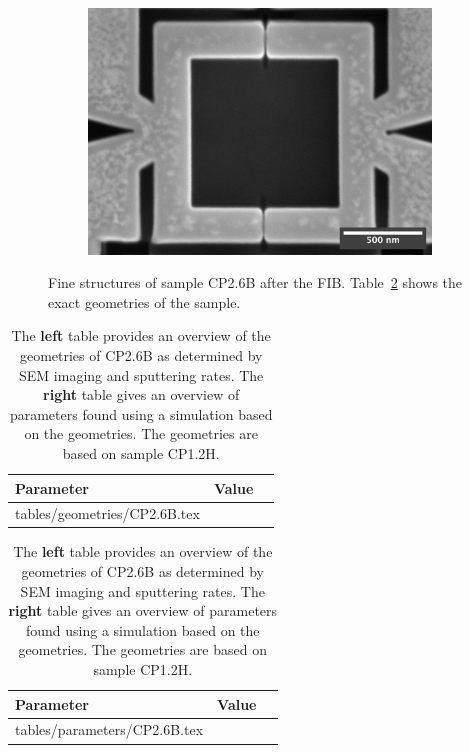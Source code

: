 \begin{figure}[ht!]
\begin{subfigure}[t]{0.3\textwidth}
	\end{subfigure}
	\hfill
	\begin{subfigure}[t]{0.3\textwidth}
		\centering
		\includegraphics[width=\textwidth]{figures/samples/CP2/CP2.6B_SEM_SQUID.jpg}
	\end{subfigure}

	\caption{Fine structures of sample CP2.6B after the FIB. Table~\ref{tab:CP2.6B-geometries} shows the exact geometries of the sample.}
	\label{fig:CP2.6B-SEM-images}
\end{figure}

\begin{table}
	\begin{subtable}{.6\linewidth}
		\begin{tabular}[t]{@{}lrr@{}}
			\toprule
			Parameter & Value \\ \midrule
			\expandableinput tables/geometries/CP2.6B.tex
			\bottomrule
		\end{tabular}
    \end{subtable}
    \hfill
    \begin{subtable}{.3\linewidth}
    	\flushright
    	\begin{tabular}[t]{@{}lrr@{}}
    		\toprule
    		Parameter & Value \\ \midrule
    		\expandableinput tables/parameters/CP2.6B.tex
    		\bottomrule
    	\end{tabular}
    \end{subtable}
    \caption{The \textbf{left} table provides an overview of the geometries of CP2.6B as determined by SEM imaging and sputtering rates. The \textbf{right} table gives an overview of parameters found using a simulation based on the geometries. The geometries are based on sample CP1.2H.}
    \label{tab:CP2.6B-geometries}
\end{table}